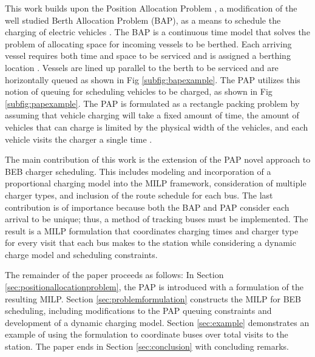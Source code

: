 This work builds upon the Position Allocation Problem \cite{Qarebagh2019}, a modification of the well studied Berth
Allocation Problem (BAP), as a means to schedule the charging of electric vehicles \cite{Buhrkal2010, Frojan2015,
  Imai2001}. The BAP is a continuous time model that solves the problem of allocating space for incoming vessels to be
berthed. Each arriving vessel requires both time and space to be serviced and is assigned a berthing location
\cite{Imai2001}. Vessels are lined up parallel to the berth to be serviced and are horizontally queued as shown in Fig
\ref{subfig:bapexample}. The PAP utilizes this notion of queuing for scheduling vehicles to be charged, as shown in Fig
\ref{subfig:papexample}. The PAP is formulated as a rectangle packing problem by assuming that vehicle charging will
take a fixed amount of time, the amount of vehicles that can charge is limited by the physical width of the vehicles,
and each vehicle visits the charger a single time \cite{Qarebagh2019}.

The main contribution of this work is the extension of the PAP novel approach to BEB charger scheduling. This includes
modeling and incorporation of a proportional charging model into the MILP framework, consideration of multiple charger
types, and inclusion of the route schedule for each bus. The last contribution is of importance because both the BAP and
PAP consider each arrival to be unique; thus, a method of tracking buses must be implemented. The result is a MILP
formulation that coordinates charging times and charger type for every visit that each bus makes to the station while
considering a dynamic charge model and scheduling constraints.

The remainder of the paper proceeds as follows: In Section \ref{sec:positionallocationproblem}, the PAP is introduced
with a formulation of the resulting MILP. Section \ref{sec:problemformulation} constructs the MILP for BEB scheduling,
including modifications to the PAP queuing constraints and development of a dynamic charging model. Section
\ref{sec:example} demonstrates an example of using the formulation to coordinate \A buses over \N total visits to the
station. The paper ends in Section \ref{sec:conclusion} with concluding remarks.

